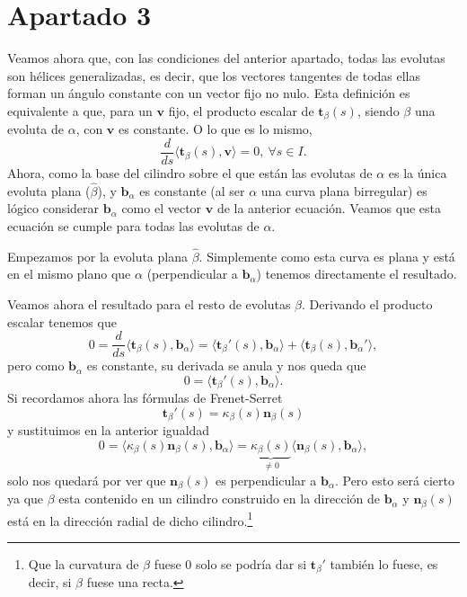 \section{Apartado 3}
Veamos ahora que, con las condiciones del anterior apartado, todas las evolutas
son hélices generalizadas, es decir, que los vectores tangentes de todas ellas
forman un ángulo constante con un vector fijo no nulo. Esta definición es
equivalente a que, para un $\mathbf{v}$ fijo, el producto escalar de
$\mathbf{t}_{\beta}\left( s \right)$, siendo $\beta$ una evoluta de $\alpha$, con $\mathbf{v}$
es constante. O lo que es lo mismo,
\[
    \frac{d}{ds}\langle \mathbf{t}_{\beta}\left( s \right), \mathbf{v} \rangle
    = 0,\ \forall s \in I.
\]
Ahora, como la base del cilindro sobre el que están las evolutas de $\alpha$ es
la única evoluta plana ($\hat{\beta}$), y $\mathbf{b}_{\alpha}$ es constante (al
ser $\alpha$ una curva plana birregular) es lógico considerar
$\mathbf{b}_{\alpha}$ como el vector $\mathbf{v}$ de la anterior ecuación.
Veamos que esta ecuación se cumple para todas las evolutas de $\alpha$.

Empezamos por la evoluta plana $\hat{\beta}$. Simplemente como esta curva es
plana y está en el mismo plano que $\alpha$ (perpendicular a
$\mathbf{b}_{\alpha}$) tenemos directamente el resultado.

Veamos ahora el resultado para el resto de evolutas $\beta$. Derivando el
producto escalar tenemos que
\[
0 = \frac{d}{ds}\langle \mathbf{t}_{\beta}\left( s \right),
\mathbf{b}_{\alpha} \rangle = \langle
\mathbf{t}_{\beta}'\left( s \right), \mathbf{b}_{\alpha} \rangle
+ \langle \mathbf{t}_{\beta}\left( s \right),
\mathbf{b}_{\alpha}' \rangle,
\]
pero como $\mathbf{b}_{\alpha}$ es constante, su derivada se anula y nos queda
que
\[
0 = \langle \mathbf{t}_{\beta}'\left( s \right), \mathbf{b}_{\alpha} \rangle.
\]
Si recordamos ahora las fórmulas de Frenet-Serret
\[
\mathbf{t}_{\beta}'\left( s \right) = \kappa_{\beta}\left( s \right)\mathbf{n}_{\beta}\left( s \right)
\]
y sustituimos en la anterior igualdad
\[
0 = \langle \kappa_{\beta}\left( s \right)\mathbf{n}_{\beta}\left( s \right),
\mathbf{b}_{\alpha} \rangle = \underbrace{\kappa_{\beta}\left( s \right)}_{\neq 0}\langle
\mathbf{n}_{\beta}\left( s \right), \mathbf{b}_{\alpha} \rangle,
\]
solo nos quedará por ver que $\mathbf{n}_{\beta}\left( s \right)$ es
perpendicular a $\mathbf{b}_{\alpha}$. Pero esto será cierto ya que $\beta$ esta
contenido en un cilindro construido en la dirección de $\mathbf{b}_{\alpha}$ y
$\mathbf{n}_{\beta}\left( s \right)$ está en la dirección radial de dicho
cilindro.\footnote{Que la curvatura de $\beta$ fuese $0$ solo se podría dar si
$\mathbf{t}_{\beta}'$ también lo fuese, es decir, si $\beta$ fuese una recta.}
